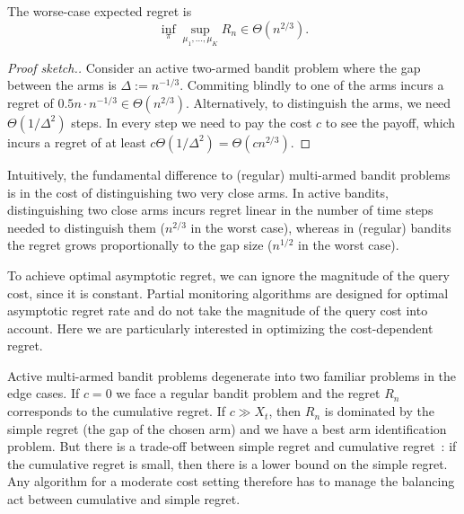 \documentclass[a4paper]{article}
\begin{document}
\begin{proposition}
The worse-case expected regret is
\[
\inf_\pi \sup_{\mu_1, \ldots, \mu_K} R_n \in \Theta(n^{2/3}).
\]
\end{proposition}
\begin{proof}[Proof sketch.]
Consider an active two-armed bandit problem
where the gap between the arms is $\Delta := n^{-1/3}$.
Commiting blindly to one of the arms incurs a regret of
$0.5n \cdot n^{-1/3} \in \Theta(n^{2/3})$.
Alternatively, to distinguish the arms,
we need $\Theta(1/\Delta^2)$ steps.
In every step we need to pay the cost $c$ to see the payoff,
which incurs a regret of
at least $c\Theta(1/\Delta^2) = \Theta(cn^{2/3})$.
\end{proof}

Intuitively, the fundamental difference to (regular) multi-armed bandit problems is in the cost of distinguishing two very close arms.
In active bandits, distinguishing two close arms incurs regret linear in the number of time steps needed to distinguish them ($n^{2/3}$ in the worst case), whereas in (regular) bandits the regret grows proportionally to the gap size ($n^{1/2}$ in the worst case).

To achieve optimal asymptotic regret, we can ignore the magnitude of the query cost, since it is constant.
Partial monitoring algorithms are designed for optimal asymptotic regret rate and do not take the magnitude of the query cost into account.
Here we are particularly interested in optimizing
the cost-dependent regret.

Active multi-armed bandit problems degenerate into two familiar problems in the edge cases.
If $c = 0$ we face a regular bandit problem and the regret $R_n$ corresponds to the cumulative regret.
If $c \gg X_t$,
then $R_n$ is dominated by the simple regret
(the gap of the chosen arm) and
we have a best arm identification problem.
But there is a trade-off between
simple regret and cumulative regret~\citep[Thm.~1]{Bubeck11}:
if the cumulative regret is small,
then there is a lower bound on the simple regret.
Any algorithm for a moderate cost setting therefore
has to manage the balancing act between cumulative and simple regret.
\end{document}
